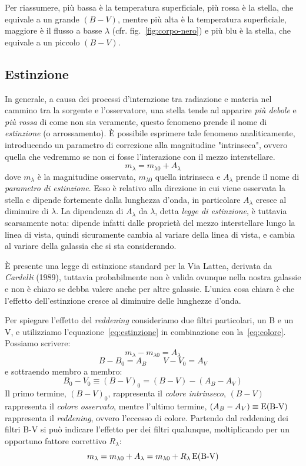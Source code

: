 Per riassumere, più bassa è la temperatura superficiale, più rossa è la stella, che equivale a un grande $(B-V)$, mentre più alta è la temperatura superficiale, maggiore è il flusso a basse $\lambda$ (cfr. fig.~\ref{fig:corpo-nero}) e più blu è la stella, che equivale a un piccolo $(B-V)$.

\subsection{Estinzione}\label{sec:reddening}
In generale, a causa dei processi d'interazione tra radiazione e materia nel cammino tra la sorgente e l'osservatore, una stella tende ad apparire \emph{più debole} e \emph{più rossa} di come non sia veramente, questo fenomeno prende il nome di \emph{estinzione} (o arrossamento). È possibile esprimere tale fenomeno analiticamente, introducendo un parametro di correzione alla magnitudine "intrinseca", ovvero quella che vedremmo se non ci fosse l'interazione con il mezzo interstellare.
\begin{equation}\label{eq:estinzione}
    m_\lambda = m_{\lambda 0} + A_\lambda
\end{equation}
dove $m_\lambda$ è la magnitudine osservata, $m_{\lambda 0}$ quella intrinseca e $A_\lambda$ prende il nome di \emph{parametro di estinzione}. Esso è relativo alla direzione in cui viene osservata la stella e dipende fortemente dalla lunghezza d'onda, in particolare $A_\lambda$ cresce al diminuire di $\lambda$. La dipendenza di $A_\lambda$ da $\lambda$, detta \emph{legge di estinzione}, è tuttavia scarsamente nota: dipende infatti dalle proprietà del mezzo interstellare lungo la linea di vista, quindi sicuramente cambia al variare della linea di vista, e cambia al variare della galassia che si sta considerando.

È presente una legge di estinzione standard per la Via Lattea, derivata da \emph{Cardelli} (1989), tuttavia probabilmente non è valida ovunque nella nostra galassie e non è chiaro se debba valere anche per altre galassie. L'unica cosa chiara è che l'effetto dell'estinzione cresce al diminuire delle lunghezze d'onda.

Per spiegare l'effetto del \emph{reddening} consideriamo due filtri particolari, un B e un V, e utilizziamo l'equazione~\eqref{eq:estinzione} in combinazione con la~\eqref{eq:colore}. Possiamo scrivere:
\[
    m_\lambda - m_{\lambda 0} = A_\lambda
\]
\[
    B - B_0 = A_B \qquad V - V_0 = A_V
\]
e sottraendo membro a membro:
\[
    B_0 - V_0 \equiv (B-V)_0 = (B-V) - (A_B - A_V)
\]
Il primo termine, $(B-V)_0$, rappresenta il \emph{colore intrinseco}, $(B-V)$ rappresenta il \emph{colore osservato}, mentre l'ultimo termine, $(A_B-A_V) \equiv \operatorname{E(B-V)}$ rappresenta il \emph{reddening}, ovvero l'eccesso di colore. Partendo dal reddening dei filtri B-V si può indicare l'effetto per dei filtri qualunque, moltiplicando per un opportuno fattore correttivo $R_\lambda$:
\begin{equation}\label{eq:reddening}
    m_\lambda = m_{\lambda 0} + A_\lambda = m_{\lambda 0} + R_\lambda \operatorname{E(B-V)}
\end{equation}

